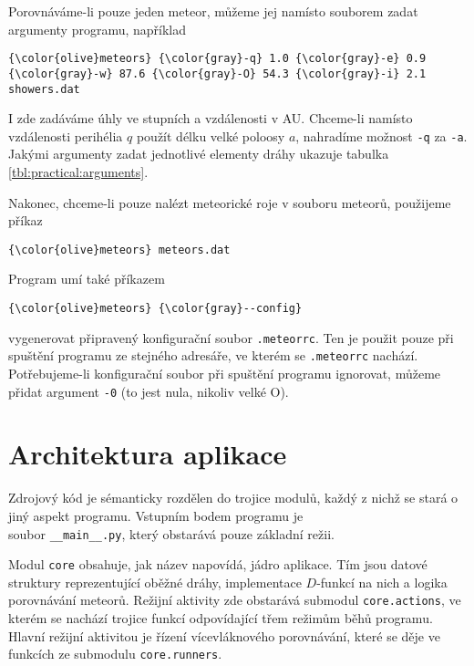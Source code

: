 Porovnáváme-li pouze jeden meteor, můžeme jej namísto souborem zadat argumenty programu, například
\begin{Verbatim}[commandchars=\\\{\},gobble=4,formatcom=\small]
    {\color{olive}meteors} {\color{gray}-q} 1.0 {\color{gray}-e} 0.9 {\color{gray}-w} 87.6 {\color{gray}-O} 54.3 {\color{gray}-i} 2.1 showers.dat
\end{Verbatim}
I zde zadáváme úhly ve stupních a vzdálenosti v AU. Chceme-li namísto vzdálenosti perihélia $q$ použít délku velké poloosy $a$, nahradíme možnost \texttt{-q} za \texttt{-a}. Jakými argumenty zadat jednotlivé elementy dráhy ukazuje tabulka \ref{tbl:practical:arguments}.

Nakonec, chceme-li pouze nalézt meteorické roje v souboru meteorů, použijeme příkaz
\begin{Verbatim}[commandchars=\\\{\},gobble=4,formatcom=\small]
    {\color{olive}meteors} meteors.dat
\end{Verbatim}

\medskip

Program umí také příkazem
\begin{Verbatim}[commandchars=\\\{\},gobble=4,formatcom=\small]
    {\color{olive}meteors} {\color{gray}--config}
\end{Verbatim}
vygenerovat připravený konfigurační soubor \texttt{.meteorrc}. Ten je použit pouze při spuštění programu ze stejného adresáře, ve kterém se \texttt{.meteorrc} nachází. Potřebujeme-li konfigurační soubor při spuštění programu ignorovat, můžeme přidat argument \texttt{-0} (to jest nula, nikoliv velké O).

\section{Architektura aplikace}%
Zdrojový kód je sémanticky rozdělen do trojice modulů, každý z nichž se stará o jiný aspekt programu. Vstupním bodem programu je \\soubor \texttt{\_\_main\_\_.py}, který obstarává pouze základní režii.

\smallskip

Modul \texttt{core} obsahuje, jak název napovídá, jádro aplikace. Tím jsou datové struktury reprezentující oběžné dráhy, implementace $D$-funkcí na nich a logika porovnávání meteorů. Režijní aktivity zde obstarává submodul \texttt{core.actions}, ve kterém se nachází trojice funkcí odpovídající třem režimům běhů programu. Hlavní režijní aktivitou je řízení vícevláknového porovnávání, které se děje ve funkcích ze submodulu \texttt{core.runners}.

